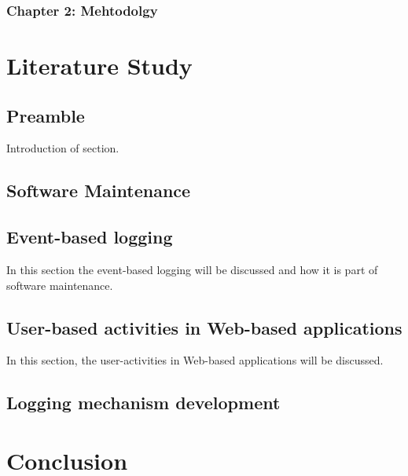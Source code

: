 \subsubsection{Chapter 2: Mehtodolgy}

\newpage
\section{Literature Study}

\subsection{Preamble}
Introduction of section.

\subsection{Software Maintenance}

\subsection{Event-based logging}
In this section the event-based logging will be discussed and how it is part of software maintenance. 

\subsection{User-based activities in Web-based applications}
In this section, the user-activities in Web-based applications will be discussed.

\subsection{Logging mechanism development}

\section{Conclusion}

